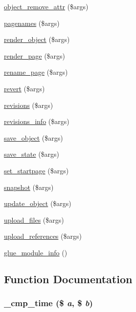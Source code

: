 \begin{CompactItemize}
\hyperlink{module__glue_8inc_8php_e16d748c2d933978daec8bf11acdc34b}{object\_\-remove\_\-attr} (\$args)
\item 
\hyperlink{module__glue_8inc_8php_354fc85f928484ae3b316bbf0065d9bd}{pagenames} (\$args)
\item 
\hyperlink{module__glue_8inc_8php_e9103a74e4b40e88536fbc0a52d1c72f}{render\_\-object} (\$args)
\item 
\hyperlink{module__glue_8inc_8php_ab1981a767de519c6c4afb946d748d0a}{render\_\-page} (\$args)
\item 
\hyperlink{module__glue_8inc_8php_cd08b36587528b6f088cafb7d1d6bd29}{rename\_\-page} (\$args)
\item 
\hyperlink{module__glue_8inc_8php_e69e25beb40feedc02d3b850587d20cc}{revert} (\$args)
\item 
\hyperlink{module__glue_8inc_8php_27d90d2ed1b4142554bc4e0e47e9ba0c}{revisions} (\$args)
\item 
\hyperlink{module__glue_8inc_8php_1dc65b69a920ac4ebc8f7c1df305060b}{revisions\_\-info} (\$args)
\item 
\hyperlink{module__glue_8inc_8php_b294f21c7f6fed0932b65167f180c78c}{save\_\-object} (\$args)
\item 
\hyperlink{module__glue_8inc_8php_60d03d7a0d8783e926835f0aa6cff698}{save\_\-state} (\$args)
\item 
\hyperlink{module__glue_8inc_8php_afa7a8fa046ff6119cb7506d68edf787}{set\_\-startpage} (\$args)
\item 
\hyperlink{module__glue_8inc_8php_5d3ad02088eee566589cd47fe0dc889a}{snapshot} (\$args)
\item 
\hyperlink{module__glue_8inc_8php_4aed316adcde13b40c9fc1b35e6537a4}{update\_\-object} (\$args)
\item 
\hyperlink{module__glue_8inc_8php_43746135e67f614d79317029aced064b}{upload\_\-files} (\$args)
\item 
\hyperlink{module__glue_8inc_8php_2099347b9bdf5a5973a13e5f7a4be933}{upload\_\-references} (\$args)
\item 
\hyperlink{module__glue_8inc_8php_9b741f04b878cbc03f1aac7d3406d548}{glue\_\-module\_\-info} ()
\end{CompactItemize}


\subsection{Function Documentation}
\hypertarget{module__glue_8inc_8php_5fea6c120a24a298149febcbf3b1df10}{
\subsubsection[{\_\-cmp\_\-time}]{\setlength{\rightskip}{0pt plus 5cm}\_\-cmp\_\-time (\$ {\em a}, \/  \$ {\em b})}}
\label{module__glue_8inc_8php_5fea6c120a24a298149febcbf3b1df10}



